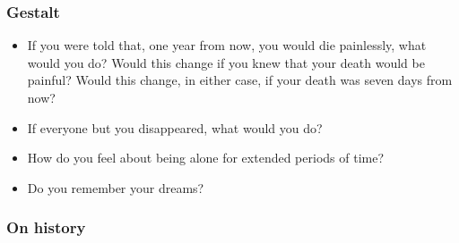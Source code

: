 \hypertarget{gestalt}{%
\subsubsection*{Gestalt}\label{gestalt}}

\begin{itemize}
\tightlist
\item
  If you were told that, one year from now, you would die painlessly, what would you do? Would this change if you knew that your death would be painful? Would this change, in either case, if your death was seven days from now?
\item
  If everyone but you disappeared, what would you do?
\item
  How do you feel about being alone for extended periods of time?
\item
  Do you remember your dreams?
\end{itemize}

\hypertarget{on-history}{%
\subsubsection*{On history}\label{on-history}}

